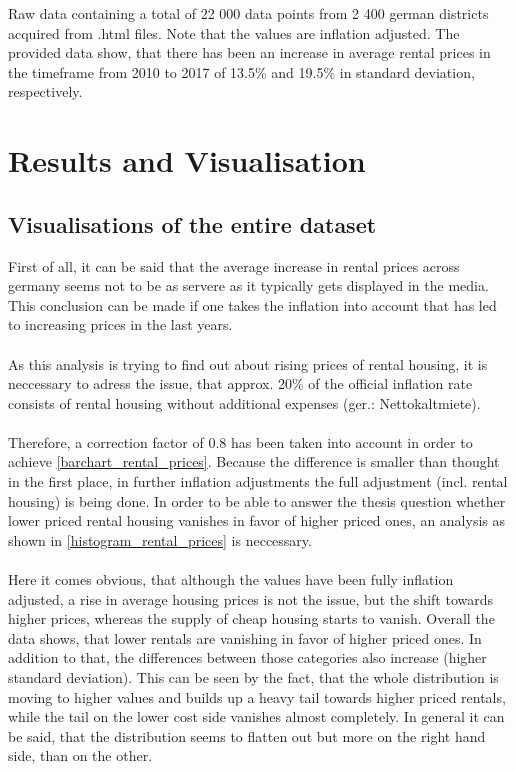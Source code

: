 \documentclass{article}
\begin{document}
\renewcommand{\arraystretch}{1.3}
		\begin{table}[h!]
			\caption{Raw data containing a total of 22 000 data points from 2 400 german districts acquired from .html files. Note that the values are inflation adjusted. The provided data show, that there has been an increase in average rental prices in the timeframe from 2010 to 2017 of 13.5\% and 19.5\% in standard deviation, respectively.}
			\label{Table_raw}
			\centering
			
		\end{table}
	\newpage
\section{Results and Visualisation}
\subsection{Visualisations of the entire dataset}
	\label{results}
	First of all, it can be said that the average increase in rental prices across germany seems not to be as servere as it typically gets displayed in the media. This conclusion can be made if one takes the inflation into account that has led to increasing prices in the last years. \cite{inflation}
	\\\\As this analysis is trying to find out about rising prices of rental housing, it is neccessary to adress the issue, that approx. 20\% of the official inflation rate consists of rental housing without additional expenses (ger.: Nettokaltmiete). \cite{inflation_ratio} 
	\\\\Therefore, a correction factor of 0.8 has been taken into account in order to achieve \cref{barchart_rental_prices}. Because the difference is smaller than thought in the first place, in further inflation adjustments the full adjustment (incl. rental housing) is being done.
	In order to be able to answer the thesis question whether lower priced rental housing vanishes in favor of higher priced ones, an analysis as shown in \cref{histogram_rental_prices} is neccessary.
	\\\\
	Here it comes obvious, that although the values have been fully inflation adjusted, a rise in average housing prices is not the issue, but the shift towards higher prices, whereas the supply of cheap housing starts to vanish. Overall the data shows, that lower rentals are vanishing in favor of higher priced ones. In addition to that, the differences between those categories also increase (higher standard deviation). This can be seen by the fact, that the whole distribution is moving to higher values and builds up a heavy tail towards higher priced rentals, while the tail on the lower cost side vanishes almost completely. In general it can be said, that the distribution seems to flatten out but more on the right hand side, than on the other.
\end{document}
